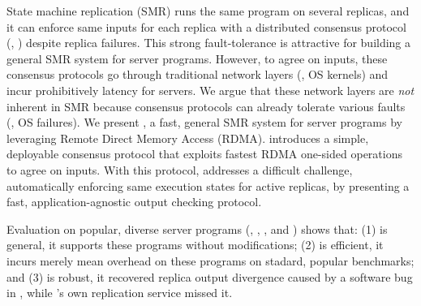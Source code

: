 

State machine replication (SMR) runs the same program on several replicas, and 
it can enforce same inputs for each replica with a distributed consensus 
protocol (\eg, \paxos) despite replica failures. This strong fault-tolerance is 
attractive for building a general SMR system for server programs. 
However, to agree on inputs, these consensus protocols go through 
traditional network layers (\eg, OS kernels) and incur prohibitively latency 
for servers. We argue that these network layers are \emph{not} inherent in SMR 
because consensus protocols can already tolerate various faults (\eg, OS 
failures). We present \xxx, a fast, general SMR system for server programs by 
leveraging Remote Direct Memory Access (RDMA). \xxx introduces a simple, 
deployable consensus protocol that exploits fastest RDMA one-sided operations to 
agree on inputs. With this protocol, \xxx addresses a difficult challenge, 
automatically enforcing same execution states for active replicas, by presenting 
a fast, application-agnostic output checking protocol.

Evaluation on \nprog popular, diverse server programs (\eg, \memcached, \mysql, 
and \clamav) shows that: (1) \xxx is general, it supports these programs 
without modifications; (2) \xxx is efficient, it incurs merely \overhead mean 
overhead on these programs on stadard, popular benchmarks; and (3) \xxx is 
robust, it recovered replica output divergence caused by a software bug in 
\redis, while \redis's own replication service missed it.


